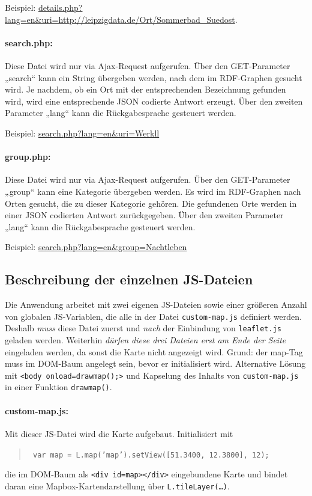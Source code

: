 \documentclass[11pt,a4paper]{article}
\begin{document}
Beispiel:
\url{details.php?lang=en&uri=http://leipzigdata.de/Ort/Sommerbad_Suedost}. 

\paragraph{search.php:} 
Diese Datei wird nur via Ajax-Request aufgerufen. Über den GET-Parameter
„search“ kann ein String übergeben werden, nach dem im RDF-Graphen gesucht
wird. Je nachdem, ob ein Ort mit der entsprechenden Bezeichnung gefunden wird,
wird eine entsprechende JSON codierte Antwort erzeugt. Über den zweiten
Parameter „lang“ kann die Rückgabesprache gesteuert werden.

Beispiel: \url{search.php?lang=en&uri=Werkll}

\paragraph{group.php:} 
Diese Datei wird nur via Ajax-Request aufgerufen. Über den GET-Parameter
„group“ kann eine Kategorie übergeben werden. Es wird im RDF-Graphen nach Orten
gesucht, die zu dieser Kategorie gehören. Die gefundenen Orte werden in einer
JSON codierten Antwort zurückgegeben. Über den zweiten Parameter „lang“ kann
die Rückgabesprache gesteuert werden.

Beispiel: \url{search.php?lang=en&group=Nachtleben}

\subsection{Beschreibung der einzelnen JS-Dateien}

Die Anwendung arbeitet mit zwei eigenen JS-Dateien sowie einer größeren Anzahl
von globalen JS-Variablen, die alle in der Datei \texttt{custom-map.js}
definiert werden.  Deshalb \emph{muss} diese Datei zuerst und \emph{nach} der
Einbindung von \texttt{leaflet.js} geladen werden.  Weiterhin \emph{dürfen
  diese drei Dateien erst am Ende der Seite} eingeladen werden, da sonst die
Karte nicht angezeigt wird. Grund: der map-Tag muss im DOM-Baum angelegt sein,
bevor er initialisiert wird. Alternative Lösung mit \texttt{<body
  onload={\dq}drawmap();{\dq}>} und Kapselung des Inhalts von
\texttt{custom-map.js} in einer Funktion \texttt{drawmap()}.  

\paragraph{custom-map.js:}         
Mit dieser JS-Datei wird die Karte aufgebaut. Initialisiert mit 
\begin{quote}\tt
  var map = L.map('map').setView([51.3400, 12.3800], 12);
\end{quote}
die im DOM-Baum als \texttt{<div id={\dq}map{\dq}></div>} eingebundene Karte
und bindet daran eine Mapbox-Kartendarstellung über
\texttt{L.tileLayer(\dots)}. 
\end{document}
